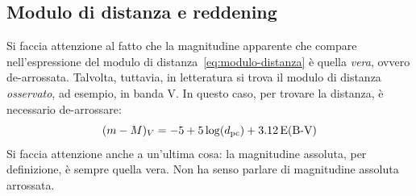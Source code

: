 \subsection{Modulo di distanza e reddening}
Si faccia attenzione al fatto che la magnitudine apparente che compare nell'espressione del modulo di distanza~\eqref{eq:modulo-distanza} è quella \emph{vera}, ovvero de-arrossata. Talvolta, tuttavia, in letteratura si trova il modulo di distanza \emph{osservato}, ad esempio, in banda V. In questo caso, per trovare la distanza, è necessario de-arrossare:
\[
    (m - M)_V = -5 + 5 \log(d_{\si{pc}}) + 3.12 \EBV
\]
Si faccia attenzione anche a un'ultima cosa: la magnitudine assoluta, per definizione, è sempre quella vera. Non ha senso parlare di magnitudine assoluta arrossata.